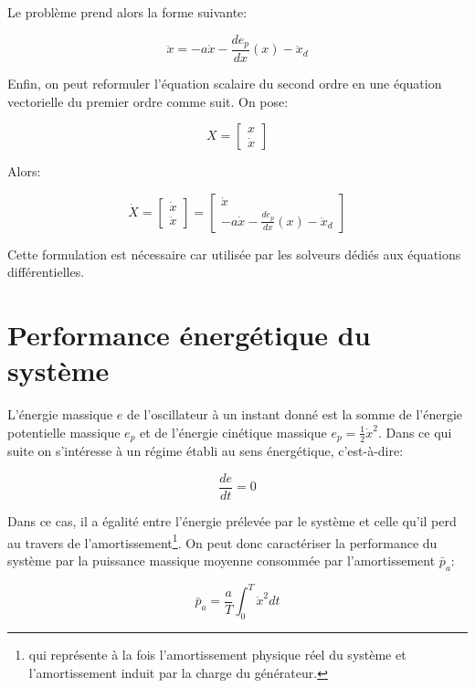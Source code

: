 \documentclass[a4paper,11pt,twoside]{article}
\begin{document}
Le problème prend alors la forme suivante:

\begin{equation}
\ddot{x} = -a \dot{x} - \frac{d e_p}{dx}(x) - \ddot{x}_d
\end{equation}

Enfin, on peut reformuler l'équation scalaire du second ordre en une équation vectorielle du premier ordre comme suit. On pose:

$$
X = \begin{bmatrix}
x \\
\dot x
\end{bmatrix}
$$

Alors:

$$
\dot X = \begin{bmatrix}
\dot x \\
\ddot x
\end{bmatrix}
=
\begin{bmatrix}
\dot x \\
-a \dot{x} -\frac{de_p}{dx}(x) -\ddot{x}_d
\end{bmatrix}
$$

Cette formulation est nécessaire car utilisée par les solveurs dédiés aux équations différentielles.

\section{Performance énergétique du système}
 
\noindent  L'énergie massique $e$ de l'oscillateur à un instant donné est la somme de l'énergie potentielle massique $e_p$ et de l'énergie cinétique massique $e_p = \frac{1}{2} \dot{x}^2$. Dans ce qui suite on s'intéresse à un régime établi au sens énergétique, c'est-à-dire:

\begin{equation}
\frac{de}{dt} = 0
\end{equation}

\noindent  Dans ce cas, il a égalité entre l'énergie prélevée par le système et celle qu'il perd au travers de l'amortissement\footnote{qui représente à la fois l'amortissement physique réel du système et l'amortissement induit par la charge du générateur.}. On peut donc caractériser la performance du système par la puissance massique moyenne consommée par l'amortissement $\bar p_a$:

\begin{equation}
\bar p_a = \frac{a}{T}\int_0^T \dot{x}^2 dt 
\end{equation}
\end{document}
